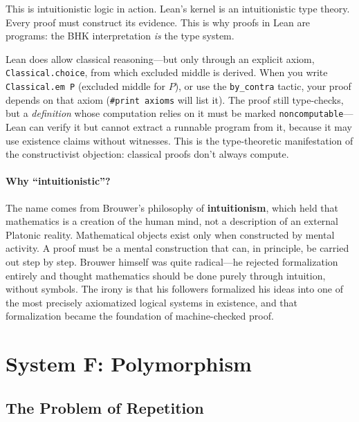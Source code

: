 \documentclass[11pt,a4paper]{article}
\theoremstyle{definition}
\begin{document}
This is intuitionistic logic in action. Lean's kernel is an intuitionistic type
theory. Every proof must construct its evidence. This is why proofs in Lean
are programs: the BHK interpretation \emph{is} the type system.

\begin{intuition}
Lean does allow classical reasoning---but only through an explicit axiom,
\texttt{Classical.choice}, from which excluded middle is derived. When you
write \texttt{Classical.em P} (excluded middle for $P$), or use the
\texttt{by\_contra} tactic, your proof depends on that axiom
(\texttt{\#print axioms} will list it). The proof still type-checks, but a
\emph{definition} whose computation relies on it must be marked
\texttt{noncomputable}---Lean can verify it but cannot extract a runnable
program from it, because it may use existence claims without witnesses. This is the type-theoretic manifestation
of the constructivist objection: classical proofs don't always compute.
\end{intuition}

\paragraph{Why ``intuitionistic''?}
The name comes from Brouwer's philosophy of \textbf{intuitionism}, which held
that mathematics is a creation of the human mind, not a description of an
external Platonic reality. Mathematical objects exist only when constructed by
mental activity. A proof must be a mental construction that can, in principle,
be carried out step by step. Brouwer himself was quite radical---he rejected
formalization entirely and thought mathematics should be done purely through
intuition, without symbols. The irony is that his followers formalized his
ideas into one of the most precisely axiomatized logical systems in existence,
and that formalization became the foundation of machine-checked proof.


\section{System F: Polymorphism}\label{sec:systemf-sec}


\subsection{The Problem of Repetition}
\end{document}
